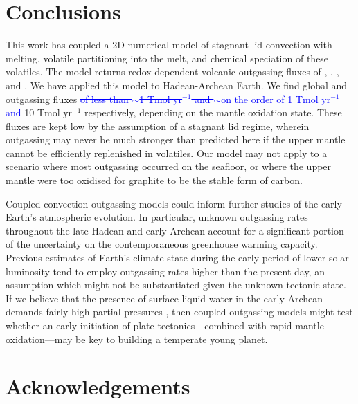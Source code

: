 \documentclass[3p,authoryear]{elsarticle}
\newcommand{\editthree}[2]{\textcolor{blue}{\sout{#1}#2}}
\begin{document}
\section{Conclusions}

This work has coupled a 2D numerical model of stagnant lid convection with melting, volatile partitioning into the melt, and chemical speciation of these volatiles. The model returns redox-dependent volcanic outgassing fluxes of , , , and . We have applied this model to Hadean-Archean Earth. We find global  and  outgassing fluxes \editthree{of less than $\sim$1 Tmol yr$^{-1}$ and $\sim$}{on the order of 1 Tmol yr$^{-1}$ and }10 Tmol yr$^{-1}$ respectively, depending on the mantle oxidation state. These fluxes are kept low by the assumption of a stagnant lid regime, wherein outgassing may never be much stronger than predicted here if the upper mantle cannot be efficiently replenished in volatiles. Our model may not apply to a scenario where most outgassing occurred on the seafloor, or where the upper mantle were too oxidised for graphite to be the stable form of carbon.


Coupled convection-outgassing models could inform further studies of the early Earth's atmospheric evolution. In particular, unknown  outgassing rates throughout the late Hadean and early Archean account for a significant portion of the uncertainty on the contemporaneous greenhouse warming capacity. Previous estimates of Earth's climate state during the early period of lower solar luminosity tend to employ outgassing rates higher than the present day, an assumption which might not be substantiated given the unknown tectonic state. If we believe that the presence of surface liquid water in the early Archean demands fairly high  partial pressures \citep{charnay2020}, then coupled outgassing models might test whether an early initiation of plate tectonics---combined with rapid mantle oxidation---may be key to building a temperate young planet.



\vspace{2cm}

\section*{Acknowledgements}
\end{document}
